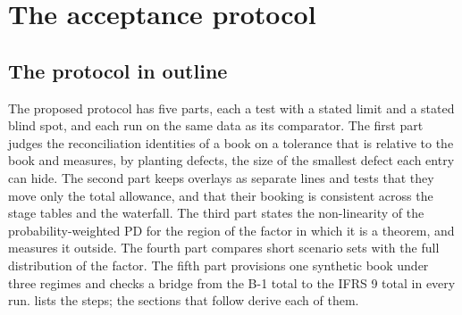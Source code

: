 \section{The acceptance protocol}
\label{sec:proposed-method}

\subsection{The protocol in outline}
\label{sec:method-outline}

The proposed protocol has five parts, each a test with a stated limit and a stated blind spot, and each run on the same data as its comparator.
The first part judges the reconciliation identities of a book on a tolerance that is relative to the book and measures, by planting defects, the size of the smallest defect each entry can hide.
The second part keeps overlays as separate lines and tests that they move only the total allowance, and that their booking is consistent across the stage tables and the waterfall.
The third part states the non-linearity of the probability-weighted PD for the region of the factor in which it is a theorem, and measures it outside.
The fourth part compares short scenario sets with the full distribution of the factor.
The fifth part provisions one synthetic book under three regimes and checks a bridge from the B-1 total to the IFRS 9 total in every run.
 lists the steps; the sections that follow derive each of them.

